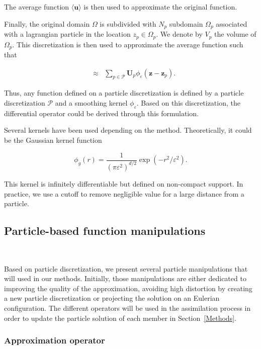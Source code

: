 The average function $\langle \bm u \rangle$ is then used to approximate the original function.

Finally, the original domain $\Omega$ is subdivided with $N_p$ subdomain $\Omega_p$ associated with a lagrangian particle in the location $z_p \in \Omega_p$. We denote by $V_p$ the volume of $\Omega_p$. This discretization is then used to approximate the average function such that

\begin{eqnarray}~\label{part_approx}
	&\approx& \sum_{p \in \mathcal P} \bm U_p \phi_\varepsilon (\bm z-\bm z_p).
\end{eqnarray}

Thus, any function defined on a particle discretization is defined by a particle discretization $\mathcal{P}$ and a smoothing kernel $\phi_\varepsilon$.
Based on this discretization, the differential operator could be derived through this formulation.

Several kernels have been used depending on the method. Theoretically, it could be the Gaussian kernel function

\begin{equation*}
	\phi_g(r) = \frac{1}{{(\pi \varepsilon^2)}^{d/2}} \exp(-r^2/\varepsilon^2).
\end{equation*}

This kernel is infinitely differentiable but defined on non-compact support. In practice, we use a cutoff to remove negligible value for a large distance from a particle.

\subsection{Particle-based function manipulations}~\label{operators}

Based on particle discretization, we present several particle manipulations that will used in our methods. Initially, those manipulations are either dedicated to improving the quality of the approximation, avoiding high distortion by creating a new particle discretization or projecting the solution on an Eulerian configuration. The different operators will be used in the assimilation process in
order to update the particle solution of each member in Section~\ref{Methods}.

\subsubsection{Approximation operator}~\label{interpOp}

